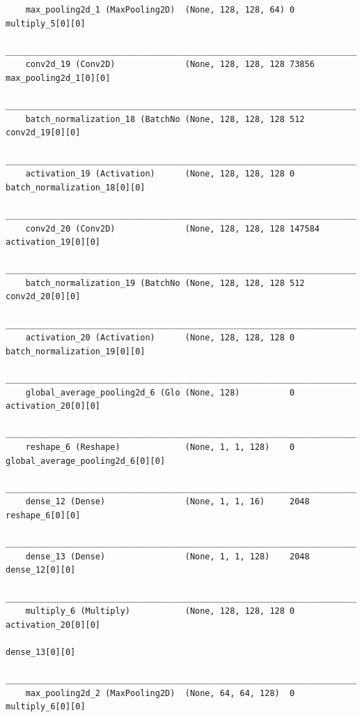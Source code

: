 {\begin{verbatim}
    max_pooling2d_1 (MaxPooling2D)  (None, 128, 128, 64) 0           multiply_5[0][0]                 
    __________________________________________________________________________________________________
    conv2d_19 (Conv2D)              (None, 128, 128, 128 73856       max_pooling2d_1[0][0]            
    __________________________________________________________________________________________________
    batch_normalization_18 (BatchNo (None, 128, 128, 128 512         conv2d_19[0][0]                  
    __________________________________________________________________________________________________
    activation_19 (Activation)      (None, 128, 128, 128 0           batch_normalization_18[0][0]     
    __________________________________________________________________________________________________
    conv2d_20 (Conv2D)              (None, 128, 128, 128 147584      activation_19[0][0]              
    __________________________________________________________________________________________________
    batch_normalization_19 (BatchNo (None, 128, 128, 128 512         conv2d_20[0][0]                  
    __________________________________________________________________________________________________
    activation_20 (Activation)      (None, 128, 128, 128 0           batch_normalization_19[0][0]     
    __________________________________________________________________________________________________
    global_average_pooling2d_6 (Glo (None, 128)          0           activation_20[0][0]              
    __________________________________________________________________________________________________
    reshape_6 (Reshape)             (None, 1, 1, 128)    0           global_average_pooling2d_6[0][0] 
    __________________________________________________________________________________________________
    dense_12 (Dense)                (None, 1, 1, 16)     2048        reshape_6[0][0]                  
    __________________________________________________________________________________________________
    dense_13 (Dense)                (None, 1, 1, 128)    2048        dense_12[0][0]                   
    __________________________________________________________________________________________________
    multiply_6 (Multiply)           (None, 128, 128, 128 0           activation_20[0][0]              
                                                                        dense_13[0][0]                   
    __________________________________________________________________________________________________
    max_pooling2d_2 (MaxPooling2D)  (None, 64, 64, 128)  0           multiply_6[0][0]                 

\end{verbatim}}

